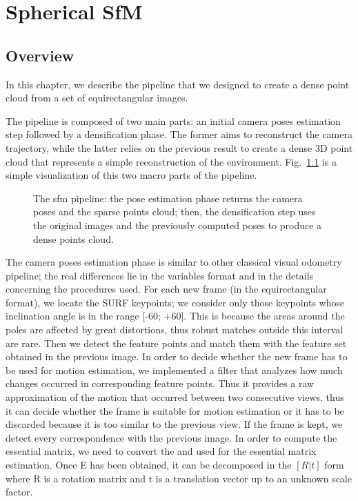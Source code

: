 \chapter{Spherical SfM}
\section{Overview}
In this chapter, we describe the pipeline that we designed to create a dense 
point cloud from a set of equirectangular images.

The pipeline is composed of two main parts: an initial camera poses estimation
step followed by a densification phase. The former aims to reconstruct the 
camera trajectory, while the latter relies on the previous result to create a dense 
3D point cloud that represents a simple reconstruction of the environment.
Fig.~\ref{fig:pipeline_overview}
is a simple visualization of this two macro parts of the 
pipeline.
\begin{figure}
    \centering
    \def\svgwidth{\columnwidth}
    
    \caption{The sfm pipeline: the pose estimation phase returns the camera 
    poses and the sparse points cloud; then, the densification step uses 
    the original images and the previously computed poses to produce a dense 
    points cloud.}
	\label{fig:pipeline_overview}
\end{figure}

The camera poses estimation phase is similar to other classical visual 
odometry pipeline; the real differences lie in the variables format and in 
the details concerning the procedures used. For each new frame 
(in the equirectangular format), we locate the
SURF keypoints; we consider only those keypoints whose inclination angle is in  
the range [-60\degree; +60\degree]. This is because the areas around the poles 
are affected by great distortions, thus robust matches outside this interval are
rare.
Then we detect the feature points and match them with the feature set 
obtained in the previous image.
%
In order to decide whether the new frame has to be used for motion estimation, 
we implemented a filter that analyzes how much changes occurred in 
corresponding feature points. Thus it provides a raw approximation of the 
motion that occurred between two consecutive views, thus it can decide whether 
the frame is suitable for motion estimation or it has to be discarded because 
it is too similar to the previous view.
%
If the frame is kept, we detect every correspondence with the previous image.
In order to compute the essential matrix, we need to convert the 
and used for the essential matrix estimation. Once E has been obtained, 
it can be decomposed in the \([R|t]\) form where R is a rotation matrix 
and t is a translation vector up to an unknown scale factor.

